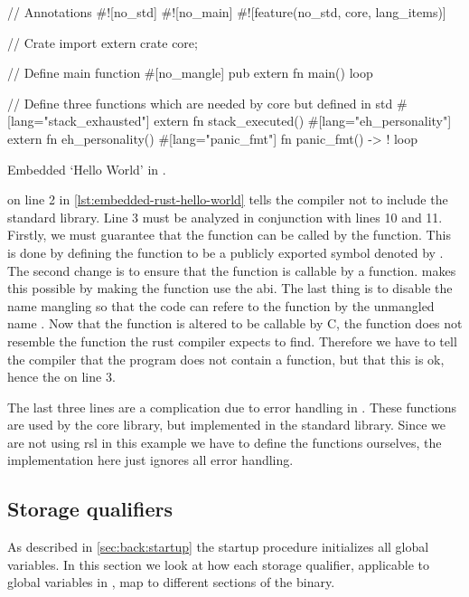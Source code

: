 \begin{listing}[H]
  \begin{rustcode}
// Annotations
#![no_std]
#![no_main]
#![feature(no_std, core, lang_items)]

// Crate import
extern crate core;

// Define main function
#[no_mangle]
pub extern fn main() {
  loop {}
}

// Define three functions which are needed by core but defined in std
#[lang="stack_exhausted"] extern fn stack_executed() {}
#[lang="eh_personality"] extern fn eh_personality() {}
#[lang="panic_fmt"] fn panic_fmt() -> ! { loop {} }
\end{rustcode}
\caption{Embedded `Hello World' in {\rust}.}
\label{lst:embedded-rust-hello-world}
\end{listing}

\attrib{\#\![no\_std]} on line 2 in \autoref{lst:embedded-rust-hello-world} tells the {\rust} compiler not to include the standard library.
Line 3 must be analyzed in conjunction with lines 10 and 11.
Firstly, we must guarantee that the function can be called by the  function.
This is done by defining the {\main} function to be a publicly exported symbol denoted by .
The second change is to ensure that the function is callable by a {\C} function.
 makes this possible by making the function use the {\C} \gls{abi}.
The last thing is to disable the {\rust} name mangling so that the {\C} code can refere to the function by the unmangled name {\main}.
Now that the {\main} function is altered to be callable by C, the function does not resemble the function the rust compiler expects to find.
Therefore we have to tell the compiler that the program does not contain a {\main} function, but that this is ok, hence the \attrib{\#\![no\_main]} on line 3.

The last three lines are a complication due to error handling in {\rust}.
These functions are used by the core library, but implemented in the standard library.
Since we are not using \gls{rsl} in this example we have to define the functions ourselves, the implementation here just ignores all error handling.

\subsection{Storage qualifiers}

As described in \autoref{sec:back:startup} the startup procedure initializes all global variables.
In this section we look at how each storage qualifier,  applicable to global variables in {\rust}, map to different sections of the {\elf} binary.

